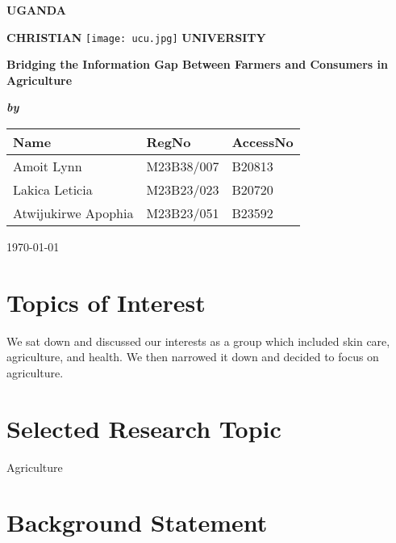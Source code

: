 \documentclass[12pt, a4paper]{article}
\begin{document}
\begin{center}

{\Large \textbf{UGANDA }}
\vspace{0.2cm}

{\Large \textbf{CHRISTIAN} \hspace{0.2cm} \texttt{[image: ucu.jpg]}
\hspace{0.2cm} \textbf{UNIVERSITY}}
\vspace{4cm}

{\large \textbf{Bridging the Information Gap Between Farmers and Consumers in Agriculture}}
\vspace{2cm}
\end{center}

\begin{center}
\textbf{\textit{by}}
\vspace{1cm}
\end{center}

\begin{center}

\begin{tabular}{|l|l|l|}
\hline
\textbf{Name}&\textbf{RegNo}&\textbf{AccessNo}\\ \hline
Amoit Lynn&M23B38/007&B20813\\ \hline
Lakica Leticia&M23B23/023&B20720\\ \hline
Atwijukirwe Apophia&M23B23/051&B23592\\ \hline
\end{tabular}
\vfill
\today

\end{center}

\newpage

\section*{Topics of Interest}

We sat down and discussed our interests as a group which included skin care, agriculture, and health. We then narrowed it down and decided to focus on agriculture.

\section*{Selected Research Topic}

Agriculture

\section*{Background Statement}
\end{document}

